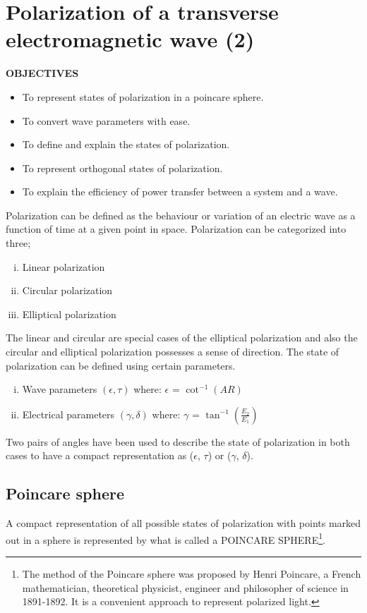 \chapter{Polarization of a transverse electromagnetic wave (2)}\label{lec:lec24}
 \textbf{OBJECTIVES}
\begin{itemize}
	\item To represent states of polarization in a poincare sphere.
	\item To convert wave parameters with ease.
	\item To define and explain the states of polarization.
	\item To represent orthogonal states of polarization. 
	\item To explain the efficiency of power transfer between a system and a wave.
\end{itemize}

Polarization can be defined as the behaviour or variation of an electric wave as a function of time at a given point in space. Polarization can be categorized into three; 
\begin{enumerate}[(i)]
\item Linear polarization
\item Circular polarization
\item Elliptical polarization
\end{enumerate}
The linear and circular are special cases of the elliptical polarization and also the circular and elliptical polarization possesses a sense of direction. The state of polarization can be defined using certain parameters.
\begin{enumerate}[(i)]
\item Wave parameters $(\epsilon,\tau)$
\newline where: $\epsilon$ = $\cot^{-1}(AR)$
\item Electrical parameters $(\gamma, \delta)$
\newline	where: $\gamma$ = $\tan^{-1} (\frac{E_{2}}{E_{1}})$
\end{enumerate}
Two pairs of angles have been used to describe the state of polarization in both cases to have a compact representation as ($\epsilon$, $\tau$)  or ($\gamma$, $\delta$).

\section{Poincare sphere}
A compact representation of all possible states of polarization with points marked out in a sphere is represented by what is called a POINCARE SPHERE\footnote{
The method of the Poincare sphere was proposed by Henri Poincare, a French mathematician, theoretical physicist, engineer and philosopher of science in 1891-1892. It is a convenient approach to represent polarized light.
}.

